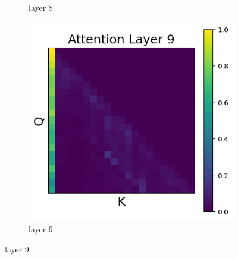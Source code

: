 \documentclass[11pt]{article}
\begin{document}
\begin{figure}[t]
\begin{subfigure}[t]{0.24\textwidth}
    \caption{layer 8}
  \end{subfigure}\hfill
      \begin{subfigure}[t]{0.24\textwidth}
    \centering
    \includegraphics[width=1.4\columnwidth]{figures/intervention5_2/layer_9.png}
    \caption{layer 9}
  \end{subfigure}\hfill
    

\end{figure}
\end{document}
